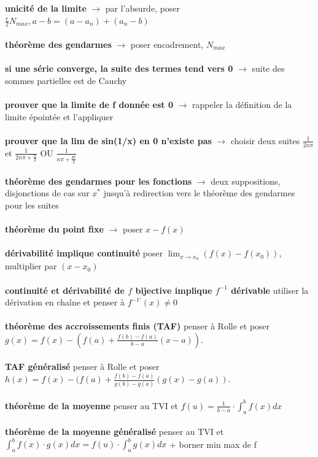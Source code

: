 \documentclass{article}
\begin{document}
\textbf{unicité de la limite} $ \rightarrow $ par l'absurde, poser $ \frac{\epsilon}{2} N_{max}, a - b = (a - a_n) + (a_n - b)$\\\\
\textbf{théorème des gendarmes} $ \rightarrow $ poser encadrement, $ N_{max} $\\\\
\textbf{si une série converge, la suite des termes tend vers 0} $ \rightarrow $ suite des sommes partielles est de Cauchy\\\\
\textbf{prouver que la limite de f donnée est 0} $ \rightarrow $ rappeler la définition de la limite épointée et l'appliquer\\\\
\textbf{prouver que la lim de sin(1/x) en 0 n'existe pas} $ \rightarrow $ choisir deux suites $ \frac{1}{2n\pi} $ et $ \frac{1}{2n\pi + \frac{\pi}{2}}$ OU $ \frac{1}{n\pi + \frac{pi}{2}}$\\\\
\textbf{théorème des gendarmes pour les fonctions} $ \rightarrow $ deux suppositions, disjonctions de cas sur $ x^* $ jusqu'à redirection vers le théorème des gendarmes pour les suites\\\\
\textbf{théorème du point fixe} $ \rightarrow $ poser $ x - f(x) $\\\\
\textbf{dérivabilité implique continuité} poser $ \lim_{x\to{x_0}} (f(x) - f(x_0)) $, multiplier par $(x - x_0)$\\\\
\textbf{continuité et dérivabilité de $ f $ bijective implique $f^{-1}$ dérivable} utiliser la dérivation en chaîne et penser à $ f^{-1'}(x) \neq 0 $\\\\
\textbf{théorème des accroissements finis (TAF)} penser à Rolle et poser $g(x) = f(x) - (f(a) + \frac{f(b) - f(a)}{b - a}(x-a))$.\\\\
\textbf{TAF généralisé} penser à Rolle et poser $ h(x) = f(x) - (f(a) + \frac{f(b) - f(a)}{g(b) - g(a)}(g(x) - g(a)) $.\\\\
\textbf{théorème de la moyenne} penser au TVI et $ f(u) = \frac{1}{b-a} \cdot \int_{a}^{b} f(x)dx $\\\\
\textbf{théorème de la moyenne généralisé} penser au TVI et $ \int_{a}^b f(x)\cdot g(x)dx = f(u) \cdot \int_{a}^b g(x)dx $ + borner min max de f
\end{document}
